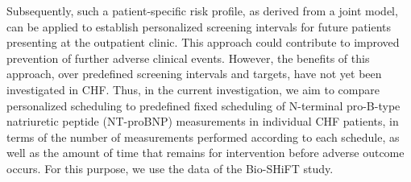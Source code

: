 Subsequently, such a patient-specific risk profile, as derived from a joint model, can be applied to establish personalized screening intervals for future patients presenting at the outpatient clinic. This approach could contribute to improved prevention of further adverse clinical events. However, the benefits of this approach, over predefined screening intervals and targets, have not yet been investigated in CHF. Thus, in the current investigation, we aim to compare personalized scheduling to predefined fixed scheduling of N-terminal pro-B-type natriuretic peptide (NT-proBNP) measurements in individual CHF patients, in terms of the number of measurements performed according to each schedule, as well as the amount of time that remains for intervention before adverse outcome occurs. For this purpose, we use the data of the Bio-SHiFT study.